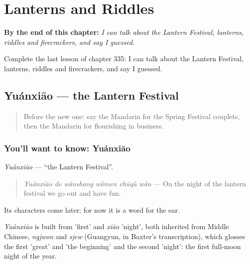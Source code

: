 
\chapter{Lanterns and Riddles}
\label{ch:zh-lanterns-and-riddles}

\begin{chapteropening}
\textbf{By the end of this chapter:} \emph{I can talk about the Lantern Festival, lanterns, riddles and firecrackers, and say I guessed.}

Complete the last lesson of chapter 335: I can talk about the Lantern Festival, lanterns, riddles and firecrackers, and say I guessed.
\end{chapteropening}

\section[Yuánxiāo]{Yuánxiāo — the Lantern Festival}

\label{lesson:ZH-C335-yuanxiao}



\begin{quote}
Before the new one: say the Mandarin for the Spring Festival couplets, then the Mandarin for flourishing in business.
\end{quote}

\subsection*{You'll want to know: Yuánxiāo}
\emph{Yuánxiāo} — \textquotedblleft{}the Lantern Festival\textquotedblright{}.

\begin{quote}
\emph{Yuánxiāo de wǎnshang wǒmen chūqù wán} — On the night of the lantern festival we go out and have fun.
\end{quote}

Its characters come later; for now it is a word for the ear.

\begin{cousinweb}
\emph{Yuánxiāo} is built from  'first' and \emph{xiāo} 'night', both inherited from Middle Chinese, \emph{ngjwon} and \emph{sjew} (Guangyun, in Baxter's transcription), which glosses the first 'great' and 'the beginning' and the second 'night': the first full-moon night of the year.
\end{cousinweb}

